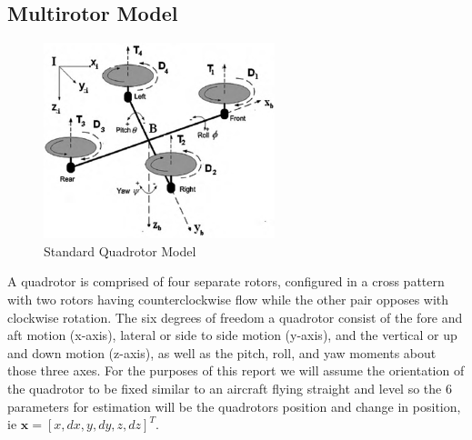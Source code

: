 \documentclass[12pt]{extarticle}
\begin{document}
\subsection{Multirotor Model}{
\begin{figure}[h!]
    \centering
    \includegraphics[width=0.6\textwidth]{Images/Quadrotor}
    \caption{Standard Quadrotor Model}\label{fig:Model}
\end{figure}
A quadrotor is comprised of four separate rotors, configured in a cross pattern with two rotors having counterclockwise flow while the other pair opposes with clockwise rotation.  The six degrees of freedom a quadrotor consist of the fore and aft motion (x-axis), lateral or side to side motion (y-axis), and the vertical or up and down motion (z-axis), as well as the pitch, roll, and yaw moments about those three axes.  For the purposes of this report we will assume the orientation of the quadrotor to be fixed similar to an aircraft flying straight and level so the 6 parameters for estimation will be the quadrotors position and change in position, ie $\pmb{x}=[x, dx, y, dy, z, dz]^T$.





}
\end{document}
